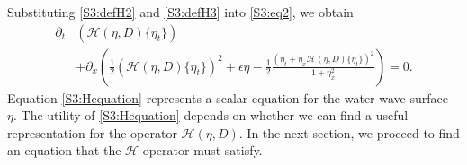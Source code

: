 Substituting \eqref{S3:defH2} and \eqref{S3:defH3} into \eqref{S3:eq2}, we obtain 
\begin{equation}\label{S3:Hequation}
\begin{aligned}
\partial_t&\left(\mathcal{H}(\eta, D)\{ \eta_t\} \right) \\
&+ \partial_x\left( \frac{1}{2}\left(\mathcal{H}(\eta, D)\{\eta_t\} \right)^2 + \epsilon \eta - \frac{1}{2} \frac{(\eta_t + \eta_x \mathcal{H}(\eta, D)\{ \eta_t\})^2}{1+\eta_x^2}\right) = 0.
\end{aligned}
\end{equation}
Equation \eqref{S3:Hequation} represents a scalar equation for the water wave surface $\eta.$ The utility of \eqref{S3:Hequation} depends on whether we can find a useful representation for the operator $\mathcal{H}(\eta, D).$ In the next section, we proceed to find an equation that the $\mathcal{H}$ operator must satisfy. 

